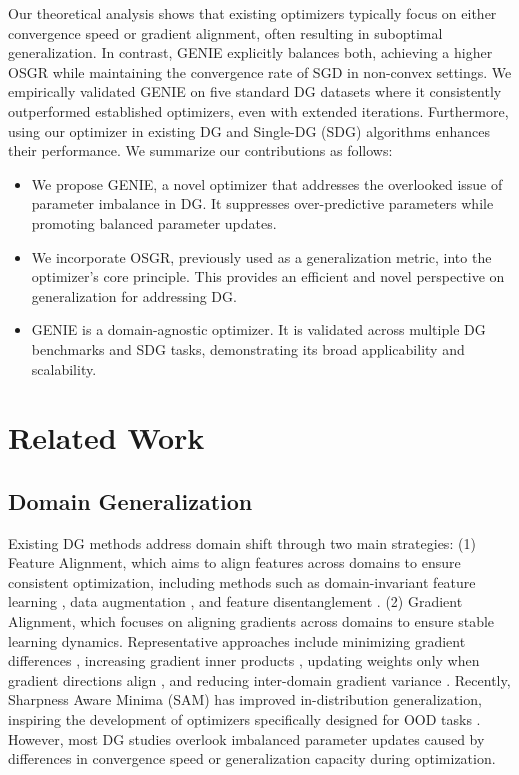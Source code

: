 \documentclass{article}
\theoremstyle{plain}
\theoremstyle{definition}
\theoremstyle{remark}
\begin{document}
 Our theoretical analysis shows that existing optimizers typically focus on either convergence speed or gradient alignment, often resulting in suboptimal generalization. In contrast, GENIE explicitly balances both, achieving a higher OSGR while maintaining the convergence rate of SGD\cite{sgd} in non-convex settings. We empirically validated GENIE on five standard DG datasets\cite{pacs,vlcs, officehome,terra,domainnet} where it consistently outperformed established optimizers, even with extended iterations. Furthermore, using our optimizer in existing DG and Single-DG (SDG) algorithms enhances their performance.
We summarize our contributions as follows:
\begin{itemize}
    \item  We propose GENIE, a novel optimizer that addresses the overlooked issue of parameter imbalance in DG. It suppresses over-predictive parameters while promoting balanced parameter updates. 
    \item  We incorporate OSGR, previously used as a generalization metric, into the optimizer’s core principle. This provides an efficient and novel perspective on generalization for addressing DG.
    \item GENIE is a domain-agnostic optimizer. It is validated across multiple DG benchmarks and SDG tasks, demonstrating its broad applicability and scalability. 
\end{itemize}
\section{Related Work}
\subsection{Domain Generalization}
Existing DG methods address domain shift through two main strategies: (1) Feature Alignment, which aims to align features across domains to ensure consistent optimization, including methods such as domain-invariant feature learning \cite{coral,irm, vrex}, data augmentation \cite{i-mixup_1, i-mixup_2, i-mixup_3}, and feature disentanglement \cite{sagnet, matchdg}. (2) Gradient Alignment, which focuses on aligning gradients across domains to ensure stable learning dynamics. Representative approaches include minimizing gradient differences \cite{iga}, increasing gradient inner products \cite{fish}, updating weights only when gradient directions align \cite{and-mask, sand-mask}, and reducing inter-domain gradient variance \cite{fishr}. Recently, Sharpness Aware Minima (SAM)\cite{sam} has improved in-distribution generalization, inspiring the development of optimizers specifically designed for OOD tasks \cite{domain-inspired,dg_sam}. However, most DG studies overlook imbalanced parameter updates caused by differences in convergence speed or generalization capacity during optimization.
\end{document}
